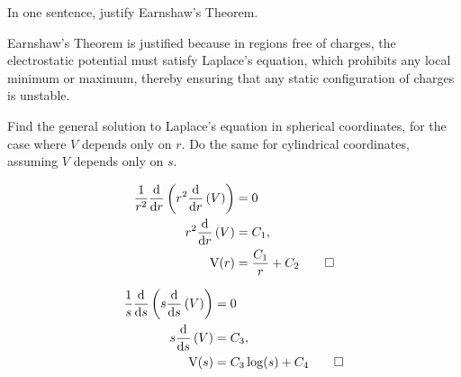 \begin{hwkProblem}{3.2}{}

	In one sentence, justify Earnshaw's Theorem.

	\hwkSol{}

	Earnshaw's Theorem is justified because in regions free of charges, the electrostatic potential must satisfy Laplace's equation, which prohibits any local minimum or maximum, thereby ensuring that any static configuration of charges is unstable.

\end{hwkProblem}
\begin{hwkProblem}{3.3}{}

	Find the general solution to Laplace's equation in spherical coordinates, for the case where \( V \) depends only on \( r \). Do the same for cylindrical coordinates, assuming \( V \) depends only on \( s \).

	\hwkSol{}

	\hwkPart{}

	\begin{align*}
		\frac{1}{r^{2}}\deriv{r}{r^{2}\deriv{r}{V}} &= 0 \\
		r^{2}\deriv{r}{V} &= C_{1}, \\
		\func{V}[r] &= \frac{C_{1}}{r} + C_{2} \qed
	\end{align*}

	\hwkPart{}

	\begin{align*}
		\frac{1}{s}\deriv{s}{s\deriv{s}{V}} &= 0 \\
		s\deriv{s}{V} &= C_{3}, \\
		\func{V}[s] &= C_{3} \log{s} + C_{4} \qed
	\end{align*}

\end{hwkProblem}
